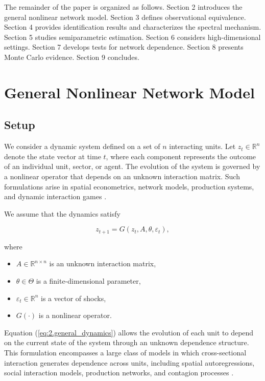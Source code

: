 \documentclass[12pt]{article}
\numberwithin{equation}{section}
\begin{document}
The remainder of the paper is organized as follows. Section 2 introduces the general nonlinear network model. Section 3 defines observational equivalence. Section 4 provides identification results and characterizes the spectral mechanism. Section 5 studies semiparametric estimation. Section 6 considers high-dimensional settings. Section 7 develops tests for network dependence. Section 8 presents Monte Carlo evidence. Section 9 concludes.


\section{General Nonlinear Network Model}

\subsection{Setup}

We consider a dynamic system defined on a set of $n$ interacting units. Let
$z_t \in \mathbb{R}^n$ denote the state vector at time $t$, where each component
represents the outcome of an individual unit, sector, or agent. The evolution
of the system is governed by a nonlinear operator that depends on an unknown
interaction matrix. Such formulations arise in spatial econometrics, network
models, production systems, and dynamic interaction games
\citep{anselin1988spatial, manski1993identification, acemoglu2012network,
graham2017econometrics}.

We assume that the dynamics satisfy

\begin{equation}
z_{t+1}
=
G(z_t, A, \theta, \varepsilon_t),
\label{eq:2.general_dynamics}
\end{equation}

where

\begin{itemize}
\item $A \in \mathbb{R}^{n \times n}$ is an unknown interaction matrix,
\item $\theta \in \Theta$ is a finite-dimensional parameter,
\item $\varepsilon_t \in \mathbb{R}^n$ is a vector of shocks,
\item $G(\cdot)$ is a nonlinear operator.
\end{itemize}

Equation (\ref{eq:2.general_dynamics}) allows the evolution of each unit to
depend on the current state of the system through an unknown dependence
structure. This formulation encompasses a large class of models in which
cross-sectional interaction generates dependence across units, including
spatial autoregressions, social interaction models, production networks, and
contagion processes \citep{anselin2010thirty, depaula2017econometrics,
elliott2014financial}.
\end{document}
